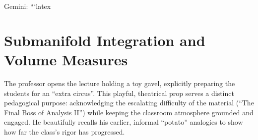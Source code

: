 Gemini: ```latex
\chapter{Submanifold Integration and Volume Measures}

\begin{nice-box}
The professor opens the lecture holding a toy gavel, explicitly preparing the students for an ``extra circus''. This playful, theatrical prop serves a distinct pedagogical purpose: acknowledging the escalating difficulty of the material (``The Final Boss of Analysis II'') while keeping the classroom atmosphere grounded and engaged. He beautifully recalls his earlier, informal ``potato'' analogies to show how far the class's rigor has progressed.
\end{nice-box}


